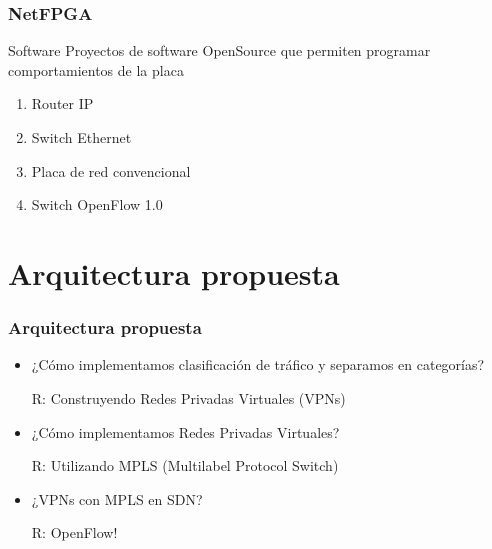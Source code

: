 \documentclass{beamer}
\begin{document}
\begin{frame}
\frametitle{NetFPGA} 
\begin{block}{Software}
Proyectos de software OpenSource que permiten programar comportamientos de la placa

\begin{enumerate}
\item Router IP
\item Switch Ethernet
\item Placa de red convencional
\item Switch OpenFlow 1.0
\end{enumerate}

\end{block}

\end{frame}







\section{Arquitectura propuesta} 


\begin{frame}
\frametitle{Arquitectura propuesta} 

\begin{itemize}
\item ¿C\'omo implementamos clasificación de tr\'afico y separamos en categorías?

\pause
R: Construyendo Redes Privadas Virtuales (VPNs)
\pause

\vspace{0.5cm}
\item ¿C\'omo implementamos Redes Privadas Virtuales?

\pause
R: Utilizando MPLS (Multilabel Protocol Switch)

\pause
\vspace{0.5cm}
\item ¿VPNs con MPLS en SDN?

\pause
R: OpenFlow!

\end{itemize}

\end{frame}
\end{document}
